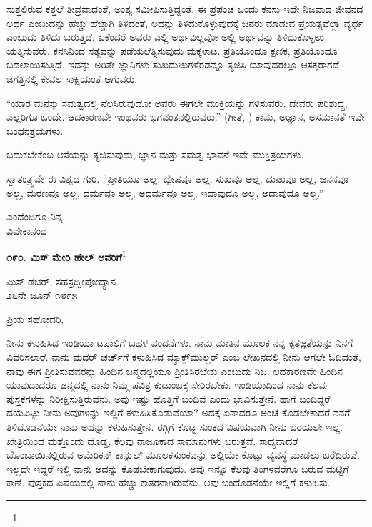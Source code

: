 ಸುತ್ತಲಿರುವ ಕತ್ತಲೆ ತೀವ್ರವಾದಂತೆ, ಅಂತ್ಯ ಸಮೀಪಿಸುತ್ತಿದ್ದಂತೆ, ಈ ಪ್ರಪಂಚ ಒಂದು ಕನಸು\enginline{-} ಇದೇ ನಿಜವಾದ ಜೀವನದ ಅರ್ಥ ಎಂಬುದನ್ನು ಹೆಚ್ಚು ಹೆಚ್ಚಾಗಿ ತಿಳಿದಂತೆ, ಅದನ್ನು ತಿಳಿದುಕೊಳ್ಳುವುದಕ್ಕೆ ಜನರು ಮಾಡುವ ಪ್ರಯತ್ನವೆಲ್ಲಾ ವ್ಯರ್ಥ ಎಂಬುದು ತಿಳಿದು ಬರುತ್ತದೆ. ಏಕೆಂದರೆ ಅವರು ಎಲ್ಲಿ ಅರ್ಥವಿಲ್ಲವೋ ಅಲ್ಲಿ ಅರ್ಥವನ್ನು ತಿಳಿದುಕೊಳ್ಳಲು ಯತ್ನಿಸುವರು. ಕನಸಿನಿಂದ ಸತ್ಯವನ್ನು ಪಡೆಯಲೆತ್ನಿಸುವುದು ಮಕ್ಕಳಾಟ. ಪ್ರತಿಯೊಂದೂ ಕ್ಷಣಿಕ, ಪ್ರತಿಯೊಂದೂ ಬದಲಾಯಿಸುತ್ತಿದೆ. ಇದನ್ನು ಅರಿತೇ ಜ್ಞಾನಿಗಳು ಸುಖ\break ದುಃಖಗಳೆರಡನ್ನೂ ತ್ಯಜಿಸಿ ಯಾವುದರಲ್ಲೂ ಆಸಕ್ತರಾಗದೆ ಜಗತ್ತಿನಲ್ಲಿ ಕೇವಲ ಸಾಕ್ಷಿಯಂತೆ ಆಗುವರು.

“ಯಾರ ಮನಸ್ಸು ಸಮತ್ವದಲ್ಲಿ ನೆಲಸಿರುವುದೋ ಅವರು ಈಗಲೇ ಮುಕ್ತಿಯನ್ನು ಗಳಿಸುವರು. ದೇವರು ಪರಿಶುದ್ಧ, ಎಲ್ಲರಿಗೂ ಒಂದೇ. ಆದಕಾರಣವೇ ಇಂಥವರು ಭಗವಂತನಲ್ಲಿರುವರು.” (ಗೀತೆ, ) ಕಾಮ, ಅಜ್ಞಾನ, ಅಸಮಾನತೆ ಇವೇ ಬಂಧನತ್ರ\break ಯಗಳು.

ಬದುಕಬೇಕೆಂಬ ಆಸೆಯನ್ನು ತ್ಯಜಿಸುವುದು, ಜ್ಞಾನ ಮತ್ತು ಸಮತ್ವ ಭಾವನೆ ಇವೇ ಮುಕ್ತಿತ್ರಯಗಳು.

ಸ್ವಾತಂತ್ರ್ಯವೇ ಈ ವಿಶ್ವದ ಗುರಿ. “ಪ್ರೀತಿಯೂ ಅಲ್ಲ, ದ್ವೇಷವೂ ಅಲ್ಲ, ಸುಖವೂ ಅಲ್ಲ, ದುಃಖವೂ ಅಲ್ಲ, ಜನನವೂ ಅಲ್ಲ, ಮರಣವೂ ಅಲ್ಲ, ಧರ್ಮವೂ ಅಲ್ಲ, ಅಧರ್ಮವೂ ಅಲ್ಲ, ಇದಾವುದೂ ಅಲ್ಲ, ಅದಾವುದೂ ಅಲ್ಲ.”

\vspace{-0.5cm}

{\flushright
ಎಂದೆಂದಿಗೂ ನಿನ್ನ\\ವಿವೇಕಾನಂದ\par}
\vspace{-0.5cm}

\begin{center}
\textbf{೧೯೦. ಮಿಸ್ ಮೇರಿ ಹೇಲ್‌ ಅವರಿಗೆ}\footnote{}
\end{center}

\vspace{-0.5cm}

\begin{flushright}
 ಮಿಸ್ ಡಚರ್‌, ಸಹಸ್ರದ್ವೀಪೋದ್ಯಾನ\\೨೬ನೇ ಜೂನ್ ೧೮೯೫
\end{flushright}
\vspace{-0.5cm}

ಪ್ರಿಯ ಸಹೋದರಿ,

ನೀನು ಕಳುಹಿಸಿದ ಇಂಡಿಯಾ ಟಪಾಲಿಗೆ ಬಹಳ ವಂದನೆಗಳು. ನಾನು ಮಾತಿನ ಮೂಲಕ ನನ್ನ ಕೃತಜ್ಞತೆಯನ್ನು ನಿನಗೆ ವಿವರಿಸಲಾರೆ. ನಾನು ಮದರ್‌ ಚರ್ಚ್‌ಗೆ ಕಳುಹಿಸಿದ ಮ್ಯಾಕ್ಸ್‌ಮುಲ್ಲರ್‌  ಎಂಬ ಲೇಖನದಲ್ಲಿ ನೀನು ಆಗಲೇ ಓದಿದಂತೆ, ನಾವು ಈಗ ಪ್ರೀತಿಸುವವರನ್ನು ಹಿಂದಿನ ಜನ್ಮದಲ್ಲಿಯೂ ಪ್ರೀತಿಸಿರಬೇಕು ಎಂಬುದು ನಿಜ. ಆದಕಾರಣವೇ ಹಿಂದಿನ ಯಾವುದಾದರೂ ಜನ್ಮದಲ್ಲಿ ನಾನು ನಿಮ್ಮ ಪವಿತ್ರ ಕುಟುಂಬಕ್ಕೆ ಸೇರಿರಬೇಕು. ಇಂಡಿಯಾದಿಂದ ನಾನು ಕೆಲವು ಪುಸ್ತಕಗಳನ್ನು ನಿರೀಕ್ಷಿಸುತ್ತಿರುವೆನು. ಅವು ಇಷ್ಟು ಹೊತ್ತಿಗೆ ಬಂದಿವೆ ಎಂದು ಭಾವಿಸುತ್ತೇನೆ. ಹಾಗೆ ಬಂದಿದ್ದರೆ ದಯವಿಟ್ಟು ನೀನು ಅವುಗಳನ್ನು ಇಲ್ಲಿಗೆ ಕಳುಹಿಸಿಕೊಡುವೆಯಾ? ಅದಕ್ಕೆ ಏನಾದರೂ ಅಂಚೆ ಕೊಡಬೇಕಾದರೆ ನನಗೆ ತಿಳಿದೊಡನೆಯೇ ನಾನು ಅದನ್ನು ಕಳುಹಿಸುತ್ತೇನೆ. ರಗ್ಗಿಗೆ ಕೊಟ್ಟ ಸುಂಕದ ವಿಷಯವಾಗಿ ನೀನು ಬರಯಲೇ ಇಲ್ಲ. ಖೇತ್ರಿಯಿಂದ ಮತ್ತೊಂದು ದೊಡ್ಡ, ಕೆಲವು ನಾಜೂಕಾದ ಸಾಮಾನುಗಳು ಬರುತ್ತವೆ. ಸಾಧ್ಯವಾದರೆ ಬೊಂಬಾಯಿನಲ್ಲಿರುವ ಅಮೆರಿಕನ್ ಕಾನ್ಸುಲ್ ಮೂಲಕ\break ಸುಂಕವನ್ನು ಅಲ್ಲಿಯೇ ಕೊಟ್ಟು ವ್ಯವಸ್ಥೆ ಮಾಡಲು ಬರೆದಿರುವೆ. ಇಲ್ಲದೇ ಇದ್ದರೆ ಇಲ್ಲಿ ನಾನು ಅದನ್ನು ಕೊಡಬೇಕಾಗುವುದು. ಅವು ಇನ್ನೂ ಕೆಲವು ತಿಂಗಳವರೆಗೂ ಬರುವ ಮಟ್ಟಿಗೆ ಕಾಣೆ. ಪುಸ್ತಕದ ವಿಷಯದಲ್ಲಿ ನಾನು ಹೆಚ್ಚು ಕಾತರನಾಗಿರುವೆನು. ಅವು ಬಂದೊಡನೆಯೇ ಇಲ್ಲಿಗೆ ಕಳುಹಿಸು.


